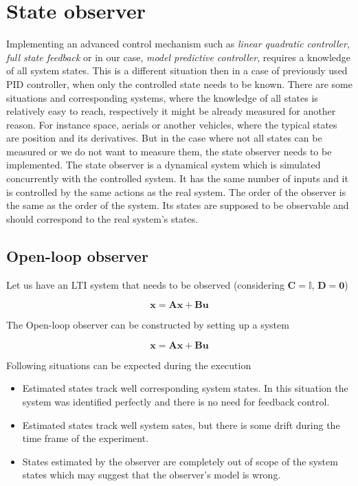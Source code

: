 \section{State observer}

Implementing an advanced control mechanism such as \textit{linear quadratic controller}, \textit{full state feedback} or in our case, \textit{model predictive controller}, requires a knowledge of all system states. This is a different situation then in a case of previously used PID controller, when only the controlled state needs to be known. There are some situations and corresponding systems, where the knowledge of all states is relatively easy to reach, respectively it might be already measured for another reason. For instance space, aerials or another vehicles, where the typical states are position and its derivatives. But in the case where not all states can be measured or we do not want to measure them, the state observer needs to be implemented. The state observer is a dynamical system which is simulated concurrently with the controlled system. It has the same number of inputs and it is controlled by the same actions as the real system. The order of the observer is the same as the order of the system. Its states are supposed to be observable and should correspond to the real system's states.

\subsection{Open-loop observer}

Let us have an LTI system that needs to be observed (considering $\textbf{C} = \mathbb{I}$, $\textbf{D} = \mathbf{0}$)

\begin{equation}
\textbf{x} = \textbf{A}\textbf{x} + \textbf{B}\textbf{u}
\end{equation}

The Open-loop observer can be constructed by setting up a system

\begin{equation}
\textbf{\^x} = \textbf{A}\textbf{\^x} + \textbf{B}\textbf{u}
\end{equation}

Following situations can be expected during the execution

\begin{itemize}
\item Estimated states track well corresponding system states. In this situation the system was identified perfectly and there is no need for feedback control.
\item Estimated states track well system sates, but there is some drift during the time frame of the experiment.
\item States estimated by the observer are completely out of scope of the system states which may suggest that the observer's model is wrong.
\end{itemize}

